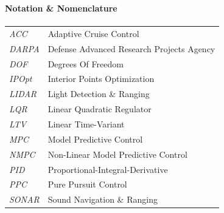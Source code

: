 \documentclass[11pt,a4paper]{report}
\begin{document}
\clearpage
\newpage
\tableofcontents
\thispagestyle{empty}
\newpage
{}
\listoffigures
{}
\newpage
{\LARGE \bf Notation \& Nomenclature}

\paragraph{}
{\large
\begin{tabular}{p{} p{}}
    \textit{ACC} & Adaptive Cruise Control\\
    \textit{DARPA} & Defense Advanced Research Projects Agency\\
    \textit{DOF} & Degrees Of Freedom\\
    \textit{IPOpt} & Interior Points Optimization\\
    \textit{LIDAR} & Light Detection \& Ranging\\
    \textit{LQR} & Linear Quadratic Regulator\\
    \textit{LTV} & Linear Time-Variant\\
    \textit{MPC} & Model Predictive Control\\
    \textit{NMPC} & Non-Linear Model Predictive Control\\
    \textit{PID} & Proportional-Integral-Derivative\\
    \textit{PPC} & Pure Pursuit Control\\
    \textit{SONAR} & Sound Navigation \& Ranging\\   
\end{tabular}
}
\newpage
\thispagestyle{plain}










\end{document}
